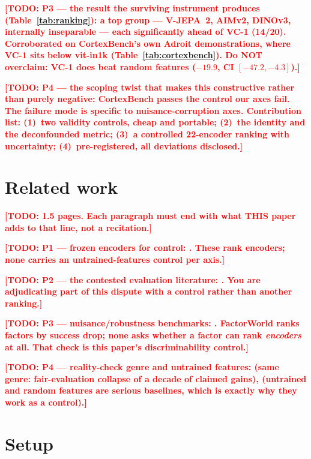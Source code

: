 \documentclass[10pt]{article}
\newcommand{\TODO}[1]{\textcolor{red}{\textbf{[TODO: #1]}}}
\begin{document}
\TODO{P3 --- the result the surviving instrument produces
(Table~\ref{tab:ranking}): a top group --- V-JEPA~2, AIMv2, DINOv3,
internally inseparable --- each significantly ahead of VC-1 (14/20).
Corroborated on CortexBench's own Adroit demonstrations, where VC-1 sits
below vit-in1k (Table~\ref{tab:cortexbench}). Do NOT overclaim: VC-1 does
beat random features ($-19.9$, CI $[-47.2, -4.3]$).}

\TODO{P4 --- the scoping twist that makes this constructive rather than
purely negative: CortexBench passes the control our axes fail. The failure
mode is specific to nuisance-corruption axes. Contribution list:
(1)~two validity controls, cheap and portable; (2)~the identity and the
deconfounded metric; (3)~a controlled 22-encoder ranking with uncertainty;
(4)~pre-registered, all deviations disclosed.}

\section{Related work}
\label{sec:related}

\TODO{1.5 pages. Each paragraph must end with what THIS paper adds to that
line, not a recitation.}

\TODO{P1 --- frozen encoders for control:
\citep{shah2021rrl,parisi2022unsurprising,nair2022r3m,radosavovic2022mvp,
majumdar2023cortexbench}. These rank encoders; none carries an
untrained-features control per axis.}

\TODO{P2 --- the contested evaluation literature:
\citep{dasari2023unbiased,schneider2024ineffectiveness,hansen2023pretraining,
burns2024what}. You are adjudicating part of this dispute with a control
rather than another ranking.}

\TODO{P3 --- nuisance/robustness benchmarks:
\citep{xie2024factorworld,pumacay2024colosseum,liu2023libero}. FactorWorld
ranks factors by success drop; none asks whether a factor can rank
\emph{encoders} at all. That check is this paper's discriminability control.}

\TODO{P4 --- reality-check genre and untrained features:
\citep{musgrave2020realitycheck} (same genre: fair-evaluation collapse of a
decade of claimed gains), \citep{ulyanov2018dip,rahimi2007random} (untrained
and random features are serious baselines, which is exactly why they work as
a control).}

\section{Setup}
\label{sec:setup}
\end{document}
